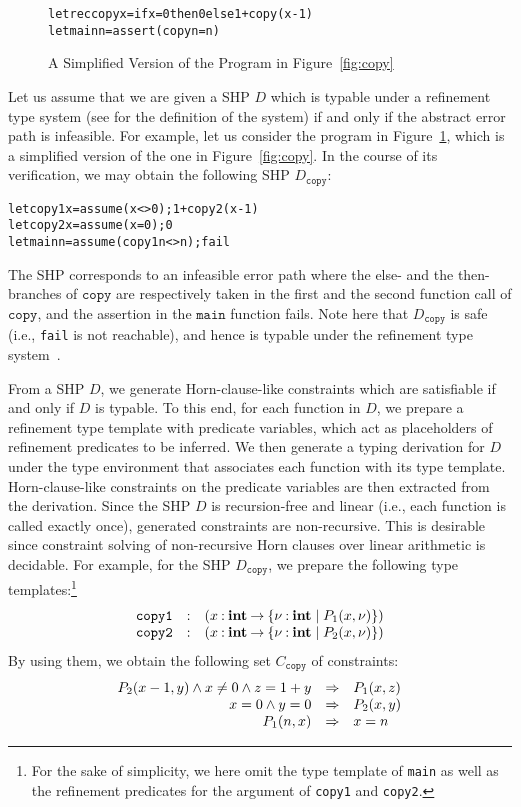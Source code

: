 \begin{figure}[t]
\begin{alltt}
letrec copy x = if x=0 then 0 else 1 + copy (x-1)
let main n = assert (copy n = n)
\end{alltt}
\caption{A Simplified Version of the Program in Figure~\ref{fig:copy}}
\label{fig:copy2}
\end{figure}

Let us assume that we are given a SHP \(D\) which is typable under a 
refinement type system (see \cite{Unno2009} for the definition of the 
system) if and only if the abstract error path is infeasible.  For 
example, let us consider the program in Figure~\ref{fig:copy2}, which is 
a simplified version of the one in Figure~\ref{fig:copy}.  In the course 
of its verification, we may obtain the following SHP 
\(D_{\texttt{copy}}\):
\begin{alltt}
 let copy1 x = assume (x<>0); 1 + copy2 (x-1)
 let copy2 x = assume (x=0); 0
 let main n = assume (copy1 n <> n); fail
\end{alltt}
The SHP corresponds to an infeasible error path where the else- and the
then-branches of \(\texttt{copy}\) are respectively taken in the first
and the second function call of \(\texttt{copy}\), and the assertion in
the \(\texttt{main}\) function fails.  Note here that
\(D_{\texttt{copy}}\) is safe (i.e., \texttt{fail} is not reachable),
and hence is typable under the refinement type system~\cite{Unno2009}.

From a SHP \(D\), we generate Horn-clause-like constraints which are
satisfiable if and only if \(D\) is typable.  To this end, for each
function in \(D\), we prepare a refinement type template with predicate
variables, which act as placeholders of refinement predicates to be
inferred.  We then generate a typing derivation for \(D\) under the type
environment that associates each function with its type template.
Horn-clause-like constraints on the predicate variables are then
extracted from the derivation.  Since the SHP \(D\) is recursion-free
and linear (i.e., each function is called exactly once), generated
constraints are non-recursive.  This is desirable since constraint
solving of non-recursive Horn clauses over linear arithmetic is
decidable.  For example, for the SHP \(D_{\texttt{copy}}\), we prepare
the following type templates:\footnote{For the sake of simplicity, we
here omit the type template of \texttt{main} as well as the refinement
predicates for the argument of \texttt{copy1} and \texttt{copy2}.}
\vspace{-2pt}
\[
\begin{array}{rcl}
\texttt{copy1}&\mathbin{:}&(x\mathbin{:}{\mathbf{int}}\mathbin{\rightarrow}{\{{\nu\mathbin{:}\mathbf{int} \mid P_1(x,\nu)}\}}) \\
\texttt{copy2}&\mathbin{:}&(x\mathbin{:}{\mathbf{int}}\mathbin{\rightarrow}{\{{\nu\mathbin{:}\mathbf{int} \mid P_2(x,\nu)}\}})
\end{array}
\]
By using them, we obtain the following set \(C_{\texttt{copy}}\) of
constraints:
\[
\begin{array}{rcl}
P_2(x-1,y) \land x\neq0 \land z=1+y &\Rightarrow& P_1(x,z) \\
x=0 \land y=0 &\Rightarrow& P_2(x,y) \\
P_1(n,x) &\Rightarrow& x=n
\end{array}
\]

